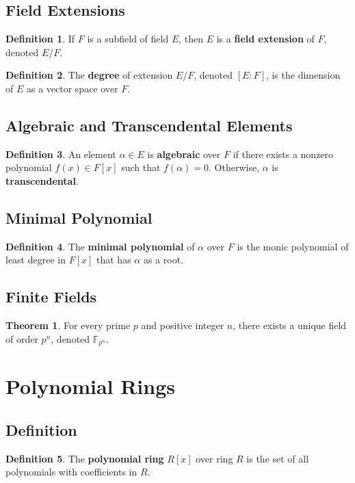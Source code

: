 \documentclass[11pt]{article}
\theoremstyle{definition}
\newtheorem{definition}{Definition}[section]
\newtheorem{theorem}{Theorem}[section]
\begin{document}
\subsection{Field Extensions}
\begin{definition}
If $F$ is a subfield of field $E$, then $E$ is a \textbf{field extension} of $F$, denoted $E/F$.
\end{definition}

\begin{definition}
The \textbf{degree} of extension $E/F$, denoted $[E:F]$, is the dimension of $E$ as a vector space over $F$.
\end{definition}

\subsection{Algebraic and Transcendental Elements}
\begin{definition}
An element $\alpha \in E$ is \textbf{algebraic} over $F$ if there exists a nonzero polynomial $f(x) \in F[x]$ such that $f(\alpha) = 0$. Otherwise, $\alpha$ is \textbf{transcendental}.
\end{definition}

\subsection{Minimal Polynomial}
\begin{definition}
The \textbf{minimal polynomial} of $\alpha$ over $F$ is the monic polynomial of least degree in $F[x]$ that has $\alpha$ as a root.
\end{definition}

\subsection{Finite Fields}
\begin{theorem}
For every prime $p$ and positive integer $n$, there exists a unique field of order $p^n$, denoted $\mathbb{F}_{p^n}$.
\end{theorem}

\section{Polynomial Rings}

\subsection{Definition}
\begin{definition}
The \textbf{polynomial ring} $R[x]$ over ring $R$ is the set of all polynomials with coefficients in $R$.
\end{definition}
\end{document}
